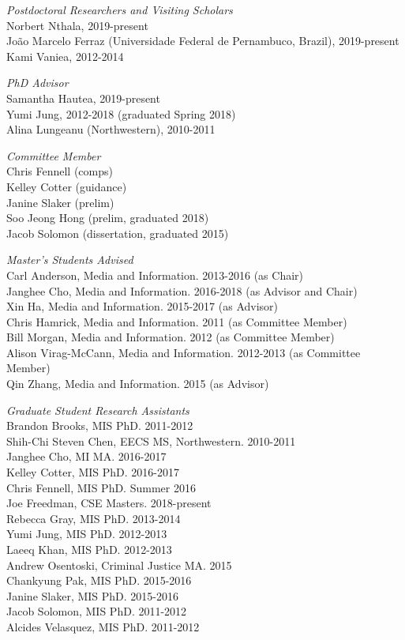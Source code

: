 \documentclass[9pt]{extarticle}
\begin{document}
\emph{Postdoctoral Researchers and Visiting Scholars} \\
\vspace{1pt}
Norbert Nthala, 2019-present \\
Jo\~ao Marcelo Ferraz (Universidade Federal de Pernambuco, Brazil), 2019-present \\
Kami Vaniea, 2012-2014

\emph{PhD Advisor} \\
\vspace{1pt}
Samantha Hautea, 2019-present \\
Yumi Jung, 2012-2018 (graduated Spring 2018) \\
Alina Lungeanu (Northwestern), 2010-2011

\emph{Committee Member} \\
\vspace{1pt}
Chris Fennell (comps) \\
Kelley Cotter (guidance) \\
Janine Slaker (prelim) \\
Soo Jeong Hong (prelim, graduated 2018) \\
Jacob Solomon (dissertation, graduated 2015)

\emph{Master's Students Advised} \\
\vspace{1pt}
Carl Anderson, Media and Information. 2013-2016 (as Chair) \\
Janghee Cho, Media and Information. 2016-2018 (as Advisor and Chair) \\
Xin Ha, Media and Information. 2015-2017 (as Advisor) \\
Chris Hamrick, Media and Information. 2011 (as Committee Member) \\
Bill Morgan, Media and Information. 2012 (as Committee Member) \\
Alison Virag-McCann, Media and Information. 2012-2013 (as Committee Member) \\
Qin Zhang, Media and Information. 2015 (as Advisor)

\emph{Graduate Student Research Assistants} \\
\vspace{1pt}
Brandon Brooks, MIS PhD. 2011-2012 \\
Shih-Chi Steven Chen, EECS MS, Northwestern. 2010-2011 \\
Janghee Cho, MI MA. 2016-2017 \\
Kelley Cotter, MIS PhD. 2016-2017 \\
Chris Fennell, MIS PhD. Summer 2016 \\
Joe Freedman, CSE Masters. 2018-present \\
Rebecca Gray, MIS PhD. 2013-2014 \\
Yumi Jung, MIS PhD. 2012-2013 \\
Laeeq Khan, MIS PhD. 2012-2013 \\
Andrew Osentoski, Criminal Justice MA. 2015 \\
Chankyung Pak, MIS PhD. 2015-2016 \\
Janine Slaker, MIS PhD. 2015-2016 \\
Jacob Solomon, MIS PhD. 2011-2012 \\
Alcides Velasquez, MIS PhD. 2011-2012
\end{document}
